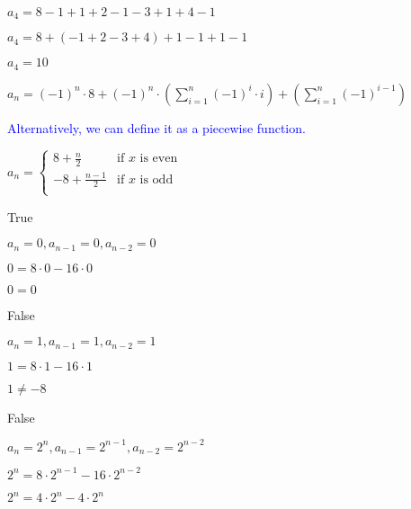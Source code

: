 \documentclass{exam}
\begin{document}
\begin{questions}
\begin{subparts}
\begin{center}
\(a_4 = 8 - 1 + 1 + 2 - 1 - 3 + 1 + 4 - 1 \)

\(a_4 = 8 + (-1 + 2 - 3 + 4) + 1 - 1 + 1 - 1 \)

\(a_4 = 10\)
\vspace{5px}

\(a_n = (-1)^n \cdot 8 + (-1)^n \cdot (\sum^n_{i=1} (-1)^i \cdot i) + (\sum^n_{i=1} (-1)^{i-1}) \)

\vspace{5px}
\textcolor{blue}{Alternatively, we can define it as a piecewise function.}

\(a_n = 
	\begin{cases}
        8+\frac{n}{2} & \text{if } x \text{ is even}\\
        -8+\frac{n-1}{2} & \text{if } x \text{ is odd}\\
    \end{cases}
\)

\end{center}

\end{subparts}

\begin{subparts}

\begin{center}
True

\( a_n = 0, a_{n-1} = 0, a_{n-2} = 0 \)

\( 0 = 8 \cdot 0 - 16 \cdot 0 \)

\( 0 = 0\)
\end{center}


\begin{center}
False

\( a_n = 1, a_{n-1} = 1, a_{n-2} = 1 \)

\( 1 = 8 \cdot 1 - 16 \cdot 1 \)

\( 1 \neq -8\)
\end{center}


\begin{center}
False

\( a_n = 2^n, a_{n-1} = 2^{n-1}, a_{n-2} = 2^{n-2} \)

\( 2^n = 8 \cdot 2^{n-1} - 16 \cdot 2^{n-2} \)

\( 2^n = 4 \cdot 2^{n} - 4 \cdot 2^{n} \)


\end{center}
\end{subparts}
\end{questions}
\end{document}
